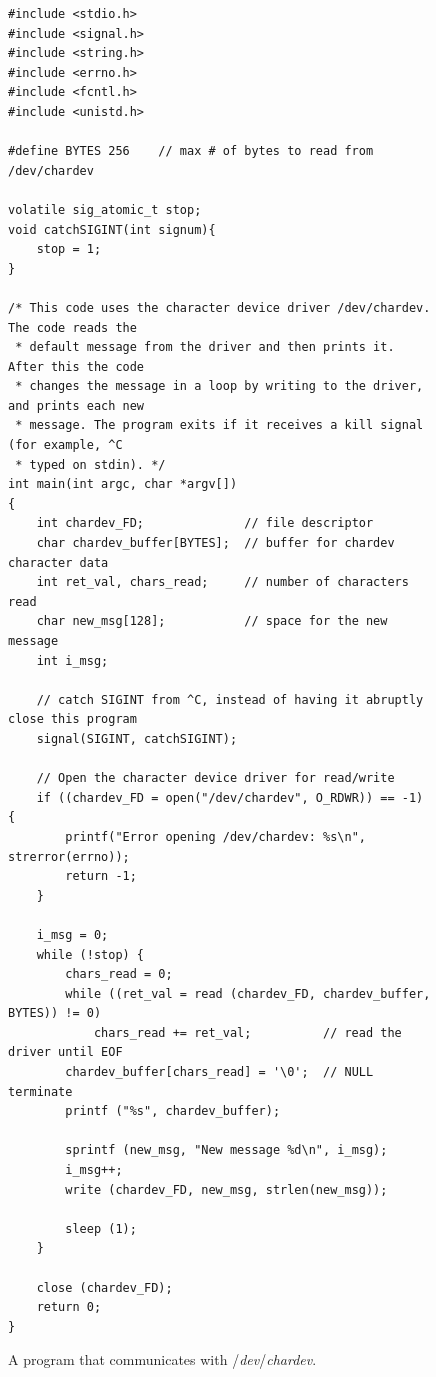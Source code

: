 \documentclass[epsfig,10pt,fullpage]{article}
\begin{document}
\lstset{language=C,numbers=none}
\begin{figure}[H]
\begin{center}
\begin{minipage}[t]{15 cm}
\begin{lstlisting}[name=part1]
#include <stdio.h>
#include <signal.h>
#include <string.h>
#include <errno.h>
#include <fcntl.h>
#include <unistd.h>

#define BYTES 256    // max # of bytes to read from /dev/chardev

volatile sig_atomic_t stop;
void catchSIGINT(int signum){
    stop = 1;
}

/* This code uses the character device driver /dev/chardev. The code reads the 
 * default message from the driver and then prints it. After this the code 
 * changes the message in a loop by writing to the driver, and prints each new
 * message. The program exits if it receives a kill signal (for example, ^C 
 * typed on stdin). */
int main(int argc, char *argv[])
{
    int chardev_FD;              // file descriptor
    char chardev_buffer[BYTES];  // buffer for chardev character data
    int ret_val, chars_read;     // number of characters read
    char new_msg[128];           // space for the new message
    int i_msg;
    
    // catch SIGINT from ^C, instead of having it abruptly close this program
    signal(SIGINT, catchSIGINT);
    
    // Open the character device driver for read/write
    if ((chardev_FD = open("/dev/chardev", O_RDWR)) == -1) {
        printf("Error opening /dev/chardev: %s\n", strerror(errno));
        return -1;
    }

    i_msg = 0;
    while (!stop) {
        chars_read = 0;
        while ((ret_val = read (chardev_FD, chardev_buffer, BYTES)) != 0)
            chars_read += ret_val;          // read the driver until EOF
        chardev_buffer[chars_read] = '\0';  // NULL terminate
        printf ("%s", chardev_buffer);

        sprintf (new_msg, "New message %d\n", i_msg);
        i_msg++;
        write (chardev_FD, new_msg, strlen(new_msg));

        sleep (1);
    }

    close (chardev_FD);
    return 0;
}
\end{lstlisting}
\end{minipage}
\caption{A program that communicates with /{\it dev}/{\it chardev}.}
\label{fig:part1}
\end{center}
\end{figure}
\end{document}
